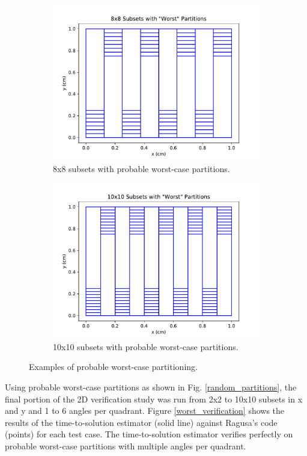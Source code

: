 \begin{figure}[H]
\begin{subfigure}[b]{0.45\textwidth}
  \includegraphics[width=\textwidth]{../cut_line_files/8_worst.pdf}
  \caption{8x8 subsets with probable worst-case partitions.}
  \label{8random}
\end{subfigure}
\begin{subfigure}[b]{0.45\textwidth}
  \includegraphics[width=\textwidth]{../cut_line_files/10_worst.pdf}
  \caption{10x10 subsets with probable worst-case partitions.}
  \label{10random}
\end{subfigure}
\caption{Examples of probable worst-case partitioning.}
\label{worst_partitions}
\end{figure}
Using probable worst-case partitions as shown in Fig. \ref{random_partitions}, the final portion of the 2D verification study was run from 2x2 to 10x10 subsets in x and y and 1 to 6 angles per quadrant.  Figure \ref{worst_verification} shows the results of the time-to-solution estimator (solid line) against Ragusa's code (points) for each test case. The time-to-solution estimator verifies perfectly on probable worst-case partitions with multiple angles per quadrant. 

